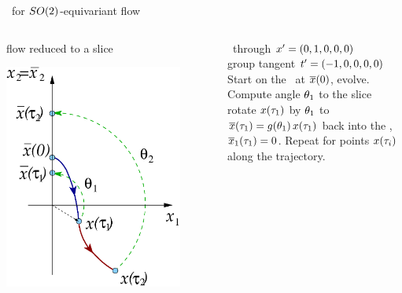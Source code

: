 \documentclass{beamer}
\begin{document}
\begin{frame}{\mframes\ for $SO(2)$-equi\-vari\-ant flow}
  \begin{columns}
\begin{block}{flow reduced to a slice}
\begin{center}
  \includegraphics[width=0.85\textwidth,clip=true]
  {../../Fig/ESunrot}
\end{center}
\end{block}
\slice\ through ${x'}=(0,1,0,0,0)$
\\
group tangent $t'_{}=(-1,0,0,0,0)$
\\
Start on the
\slice\ at $\overline{x}(0)$, evolve. Compute angle ${\bf \theta}_1$
to the slice
\\
rotate $x(\tau_1)$
by ${\bf \theta}_1$ to $\overline{x}(\tau_1) =
g({\bf \theta}_1)\,x(\tau_1)$ back
into the \slice, $\overline{x}_1(\tau_1) =0$. Repeat
for points $x(\tau_i)$ along the trajectory.
 \end{columns}
\end{frame}
\end{document}
